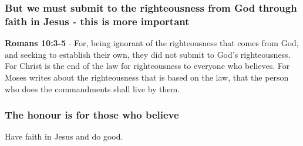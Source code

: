 \documentclass[11pt]{article}
\begin{document}
\subsubsection{But we must submit to the righteousness from God through faith in Jesus - this is more important}
\label{sec:orgd76f09a}
\textbf{Romans 10:3-5} - For, being ignorant of the righteousness that comes from God, and seeking to establish their own, they did not submit to God's righteousness.  For Christ is the end of the law for righteousness to everyone who believes.  For Moses writes about the righteousness that is based on the law, that the person who does the commandments shall live by them.

\subsubsection{The honour is for those who believe}
\label{sec:orgf97c22d}
Have faith in Jesus and do good.
\end{document}
